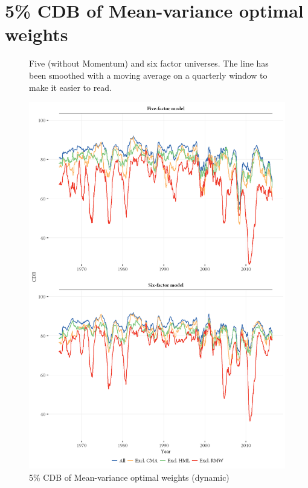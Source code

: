 
\section{5\% CDB of Mean-variance optimal weights} %
\label{sec:conditional_diversification_benefit}

\begin{figure}[!ht]
  \centering
  \footnotesize
  \renewcommand{\arraystretch}{1.2}
  \caption{5\% CDB of Mean-variance optimal weights (dynamic)}

  \begin{longcaption}
    Five (without Momentum) and six factor universes. The line has been smoothed with a moving average on a quarterly window to make it easier to read.
  \end{longcaption}
  \includegraphics[scale = 1]{graphics/cdb/MV.png}
\end{figure}

